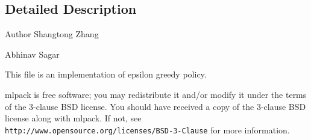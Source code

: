 \subsection{Detailed Description}
\begin{DoxyAuthor}{Author}
Shangtong Zhang 

Abhinav Sagar
\end{DoxyAuthor}
This file is an implementation of epsilon greedy policy.

mlpack is free software; you may redistribute it and/or modify it under the terms of the 3-\/clause B\+SD license. You should have received a copy of the 3-\/clause B\+SD license along with mlpack. If not, see {\tt http\+://www.\+opensource.\+org/licenses/\+B\+S\+D-\/3-\/\+Clause} for more information. 
